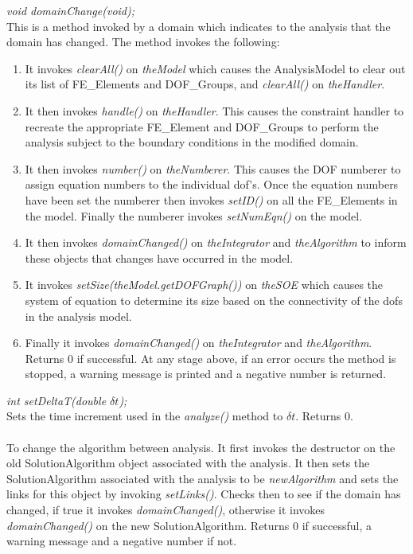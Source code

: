 {\em void domainChange(void);}\\
This is a method invoked by a domain which indicates to the analysis
that the domain has changed. The method invokes the following:
\begin{enumerate} 
\item It invokes {\em clearAll()} on {\em theModel} which causes the
AnalysisModel to clear out its list of FE\_Elements and DOF\_Groups,
and {\em clearAll()} on {\em theHandler}.
\item It then invokes {\em handle()} on {\em theHandler}. This causes
the constraint handler to recreate the appropriate FE\_Element and
DOF\_Groups to perform the analysis subject to the boundary conditions
in the modified domain.
\item It then invokes {\em number()} on {\em theNumberer}. This causes
the DOF numberer to assign equation numbers to the individual
dof's. Once the equation numbers have been set the numberer then
invokes {\em setID()} on all the FE\_Elements in the model. Finally
the numberer invokes {\em setNumEqn()} on the model.
\item It then invokes {\em domainChanged()} on {\em theIntegrator} and
{\em theAlgorithm} to inform these objects that changes have occurred
in the model.
\item It invokes {\em setSize(theModel.getDOFGraph())} on {\em
theSOE} which causes the system of equation to determine its size
based on the connectivity of the dofs in the analysis model. 
\item Finally it invokes {\em domainChanged()} on {\em theIntegrator} and 
{\em theAlgorithm}. 
Returns $0$ if successful. At any stage above, if an error occurs the
method is stopped, a warning message is printed and a negative number
is returned. \\ 
\end{enumerate}

{\em int setDeltaT(double $\delta t$);} \\
Sets the time increment used in the {\em analyze()} method to $\delta
t$. Returns $0$.\\

\\
To change the algorithm between analysis. It first invokes the
destructor on the old SolutionAlgorithm object associated with the
analysis. It then sets the SolutionAlgorithm 
associated with the analysis to be {\em newAlgorithm} and sets the
links for this object by invoking {\em setLinks()}. Checks then to
see if the domain has changed, if true it invokes {\em
domainChanged()}, otherwise it invokes {\em domainChanged()} on the
new SolutionAlgorithm. Returns $0$ if successful, a warning message
and a negative number if not.\\

